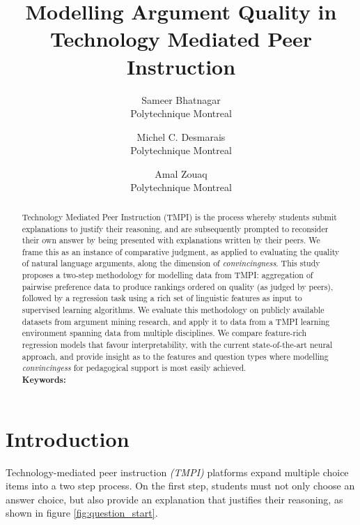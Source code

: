 \documentclass[notitlepage,12pt]{jedm}
\begin{document}
	
	\title{Modelling Argument Quality in Technology Mediated Peer Instruction}
	\date{} %
	
	\author{
		{\large Sameer Bhatnagar}
		\\Polytechnique Montreal
	 	\and 
	 	{\large Michel C. Desmarais}
	 	\\Polytechnique Montreal
	 	\and 
	 	{\large Amal Zouaq}
 		\\Polytechnique Montreal
 }

	
	\maketitle
	
	\begin{abstract}
		Technology Mediated Peer Instruction (TMPI) is the process whereby 
		students submit explanations to justify their reasoning, and are 
		subsequently prompted to reconsider their own answer by being presented 
		with explanations written by their peers. 
		We frame this as an instance of comparative judgment, as applied to 
		evaluating the quality of natural language arguments, along the 
		dimension of \textit{convincingness}.
		This study proposes a two-step methodology for modelling data from 
		TMPI: aggregation of pairwise preference data to produce rankings 
		ordered on quality (as judged by peers), followed by a regression task 
		using a rich set of linguistic features as input to supervised learning 
		algorithms.
		We evaluate this methodology on publicly available datasets from 
		argument mining research, and apply it to data from a TMPI learning 
		environment spanning data from multiple disciplines.
		We compare feature-rich regression models that favour interpretability, 
		with the current state-of-the-art neural approach, and provide 
		insight as to the features and question types where modelling 
		\textit{convincingess} for pedagogical support is most easily achieved.
		\\ %
		{\parindent0pt
			\textbf{Keywords:} 
		}
	\end{abstract}

\section{Introduction}
Technology-mediated peer instruction \textit{(TMPI)} platforms 
\cite{charles_harnessing_2019}\cite{univeristy_of_british_columbia_ubc/ubcpi_2019}
expand multiple choice items into a two step process.
On the first step, students must not only choose an answer choice, but also 
provide an explanation that justifies their reasoning, as shown in figure 
\ref{fig:question_start}.
\end{document}
